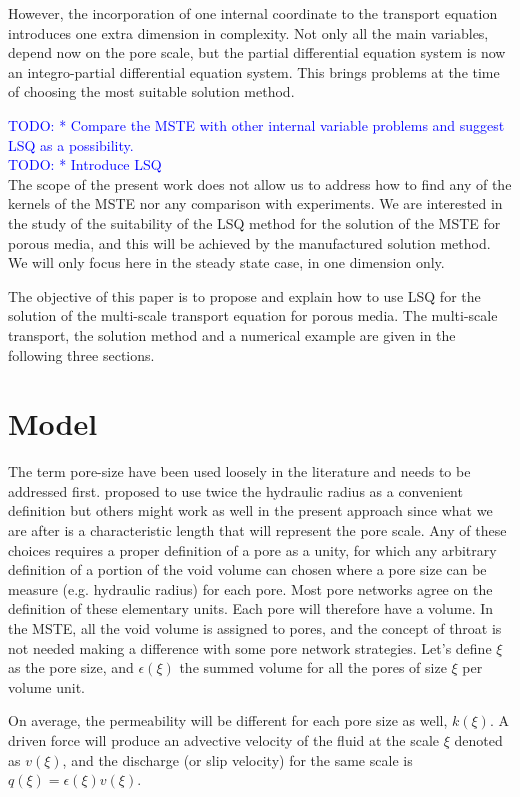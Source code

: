 \documentclass{CFD2011}
\newcommand{\TODO}[1]{\textcolor{blue}{TODO: #1} \\}
\begin{document}
However, the incorporation of one internal coordinate to the transport equation introduces one extra dimension in complexity. Not only all the main variables, depend now on the pore scale, but the partial differential equation system is now an integro-partial differential equation system. This brings problems at the time of choosing the most suitable solution method. 

\TODO{     * Compare the MSTE with other internal variable problems and suggest LSQ as a possibility.}

\TODO{     * Introduce LSQ}




The scope of the present work does not allow us to address how to find any of the kernels of the MSTE nor any comparison with experiments. We are interested in the study of the suitability of the LSQ method for the solution of the MSTE for porous media, and this will be achieved by the manufactured solution method. We will only focus here in the steady state case, in one dimension only.

The objective of this paper is to propose and explain how to use LSQ for the solution of the multi-scale transport equation for porous media. The multi-scale transport, the solution method and a numerical example are given in the following three sections.

\section{Model}

The term pore-size have been used loosely in the literature and needs to be addressed first. \cite{Dullien} proposed to use twice the hydraulic radius as a convenient definition but others might work as well in the present approach since what we are after is a characteristic length that will represent the pore scale. Any of these choices requires a proper definition of a pore as a unity, for which any arbitrary definition of a portion of the void volume can chosen where a pore size can be measure (e.g. hydraulic radius) for each pore. Most pore networks agree on the definition of these elementary units. Each pore will therefore have a volume. In the MSTE, all the void volume is assigned to pores, and the concept of throat is not needed making a difference with some pore network strategies. Let's define $\xi$ as the pore size, and $\epsilon(\xi)$ the summed volume for all the pores of size $\xi$ per volume unit.

On average, the permeability will be different for each pore size as well, $k(\xi)$. A driven force will produce an advective velocity of the fluid at the scale $\xi$ denoted as $v(\xi)$, and the discharge (or slip velocity) for the same scale is $q(\xi)=\epsilon(\xi) v(\xi)$.
\end{document}
